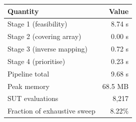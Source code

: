 \begin{tabular}{lr}
\toprule
Quantity & Value \\
\midrule
Stage 1 (feasibility) & 8.74 s \\
Stage 2 (covering array) & 0.00 s \\
Stage 3 (inverse mapping) & 0.72 s \\
Stage 4 (prioritise) & 0.23 s \\
Pipeline total & 9.68 s \\
Peak memory & 68.5 MB \\
SUT evaluations & 8{,}217 \\
Fraction of exhaustive sweep & 8.22\% \\
\bottomrule
\end{tabular}